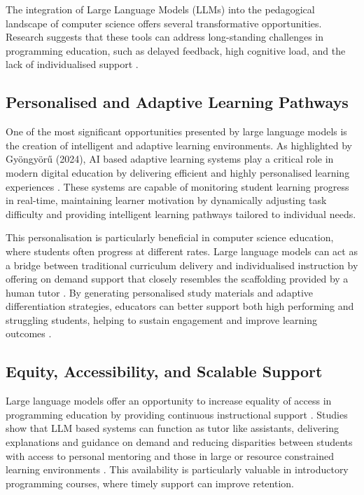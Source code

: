 \documentclass[10pt,journal,compsoc]{IEEEtran}
\begin{document}
The integration of Large Language Models (LLMs) into the pedagogical landscape of computer science offers several transformative opportunities. Research suggests that these tools can address long-standing challenges in programming education, such as delayed feedback, high cognitive load, and the lack of individualised support \cite{wang2024largelanguagemodelseducation, 10.1145/3641554.3701863}.

\subsection{Personalised and Adaptive Learning Pathways} 

One of the most significant opportunities presented by large language models is the creation of intelligent and adaptive learning environments. As highlighted by Gyöngyörű (2024), AI based adaptive learning systems play a critical role in modern digital education by delivering efficient and highly personalised learning experiences \cite{katona_ai-based_2025}. These systems are capable of monitoring student learning progress in real-time, maintaining learner motivation by dynamically adjusting task difficulty and providing intelligent learning pathways tailored to individual needs.

This personalisation is particularly beneficial in computer science education, where students often progress at different rates. Large language models can act as a bridge between traditional curriculum delivery and individualised instruction by offering on demand support that closely resembles the scaffolding provided by a human tutor \cite{Kasneci2023}. By generating personalised study materials and adaptive differentiation strategies, educators can better support both high performing and struggling students, helping to sustain engagement and improve learning outcomes \cite{srivastava-goodman-2021-question}.

\subsection{Equity, Accessibility, and Scalable Support}

Large language models offer an opportunity to increase equality of access in programming education by providing continuous instructional support \cite{Batzaikhan2024}. Studies show that LLM based systems can function as tutor like assistants, delivering explanations and guidance on demand and reducing disparities between students with access to personal mentoring and those in large or resource constrained learning environments \cite{Kasneci2023, Deriba2023}. This availability is particularly valuable in introductory programming courses, where timely support can improve retention.
\end{document}
